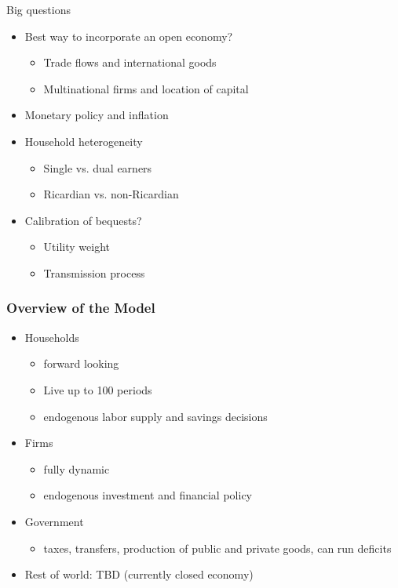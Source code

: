 \documentclass{beamer}
\begin{document}
      \begin{frame}{Big questions}
  \begin{itemize}
\item Best way to incorporate an open economy?
	\begin{itemize}
	\item Trade flows and international goods
	\item Multinational firms and location of capital
	\end{itemize}
\item Monetary policy and inflation
\item Household heterogeneity
	\begin{itemize}
	\item Single vs. dual earners
	\item Ricardian vs. non-Ricardian
	\end{itemize}
\item Calibration of bequests?
	\begin{itemize}
	\item Utility weight
	\item Transmission process
	\end{itemize}
\end{itemize}
\end{frame}

  \begin{frame}
    \frametitle{Overview of the Model}
    \begin{itemize}
      \item Households
        \begin{itemize}
          \item forward looking
          \item Live up to 100 periods
          \item endogenous labor supply and savings decisions
        \end{itemize}
      \vspace{3mm}
      \item Firms
        \begin{itemize}
          \item fully dynamic
          \item endogenous investment and financial policy
        \end{itemize}
      \vspace{3mm}
      \item Government
        \begin{itemize}
          \item taxes, transfers, production of public and private goods, can run deficits
        \end{itemize}
      \vspace{3mm}
      \item Rest of world: TBD (currently closed economy)
    \end{itemize}
  \end{frame}
\end{document}
